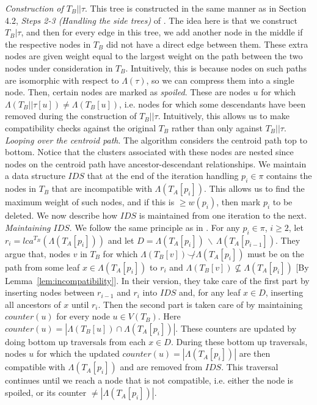 \documentclass{article}
\newcommand{\compatible}{\smile}
\newcommand{\leafset}{\Lambda}
\begin{document}
    \textit{Construction of $T_B||\tau$}. This tree is constructed in the same manner as in Section 4.2, \textit{Steps 2-3 (Handling the side trees)} of \cite{jansson2018algorithms}. The idea here is that we construct $T_B|\tau$, and then for every edge in this tree, we add another node in the middle if the respective nodes in $T_B$ did not have a direct edge between them. These extra nodes are given weight equal to the largest weight on the path between the two nodes under consideration in $T_B$. Intuitively, this is because nodes on such paths are isomorphic with respect to $\leafset(\tau)$, so we can compress them into a single node. Then, certain nodes are marked as \textit{spoiled}. These are nodes $u$ for which $\leafset(T_B||\tau[u]) \neq \leafset(T_B[u])$, i.e. nodes for which some descendants have been removed during the construction of $T_B||\tau$. Intuitively, this allows us to make compatibility checks against the original $T_B$ rather than only against $T_B||\tau$.\\

    \textit{Looping over the centroid path}. The algorithm considers the centroid path top to bottom. Notice that the clusters associated with these nodes are nested since nodes on the centroid path have ancestor-descendant relationships. We maintain a data structure $IDS$ that at the end of the iteration handling $p_i \in \pi$ contains the nodes in $T_B$ that are incompatible with $\leafset(T_A[p_i])$. This allows us to find the maximum weight of such nodes, and if this is $\geq w(p_i)$, then mark $p_i$ to be deleted. We now describe how $IDS$ is maintained from one iteration to the next.\\

    \textit{Maintaining $IDS$}. We follow the same principle as in \cite{jansson2018algorithms}. For any $p_i \in \pi$, $i \geq 2$, let $r_i = lca^{T_B}(\leafset(T_A[p_i]))$ and let $D = \leafset(T_A[p_i])\, \backslash\, \leafset(T_A[p_{i-1}])$. They argue that, nodes $v$ in $T_B$ for which $\leafset(T_B[v]) \not\compatible \leafset(T_A[p_i])$ must be on the path from some leaf $x \in \leafset(T_A[p_i])$ to $r_i$ and $\leafset(T_B[v]) \not\subseteq \leafset(T_A[p_i])$ [By Lemma~\ref{lem:incompatibility}]. In their version, they take care of the first part by inserting nodes between $r_{i-1}$ and $r_i$ into $IDS$ and, for any leaf $x \in D$, inserting all ancestors of $x$ until $r_i$. Then the second part is taken care of by maintaining $counter(u)$ for every node $u \in V(T_B)$. Here $counter(u) = |\leafset(T_B[u]) \cap \leafset(T_A[p_i])|$. These counters are updated by doing bottom up traversals from each $x \in D$. During these bottom up traversals, nodes $u$ for which the updated $counter(u) = |\leafset(T_A[p_i])|$ are then compatible with $\leafset(T_A[p_i])$ and are removed from $IDS$. This traversal continues until we reach a node that is not compatible, i.e. either the node is spoiled, or its counter $\neq |\leafset(T_A[p_i])|$.\\
\end{document}
